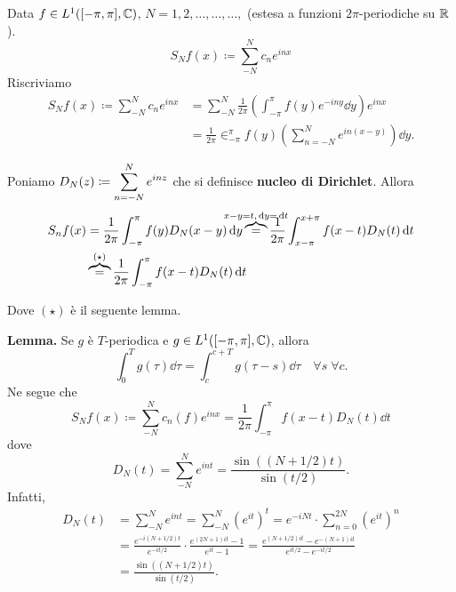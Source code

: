 Data $f \in L^1([-\pi,\pi], \mathbb C) $, $N = 1,2,\ldots,\ldots,\ldots,$ (estesa a funzioni $2\pi$-periodiche su $\mathbb R$).
%
$$
S_N f(x) \coloneqq \sum_{-N}^N c_n e^{inx}  
$$
%
Riscriviamo
%
\begin{align*}
S_N f(x) \coloneqq \sum_{-N}^N c_n e^{inx} & = \sum_{-N}^N \frac{1}{2\pi} \left( \int_{-\pi}^\pi f(y) e^{-iny} \dd y \right) e^{inx} \\
& = \frac{1}{2\pi} \in_{-\pi}^\pi f(y) \left( \sum_{n=-N}^{N} e^{in(x-y)}  \right) \dd y.
\end{align*}

Poniamo $\displaystyle D_N(z) \coloneqq \sum_{n=-N}^{N} e^{inz} $ che si definisce \textbf{nucleo di Dirichlet}. Allora
%
\begin{align*}
S_n f(x) & = \frac{1}{2\pi} \int_{-\pi}^\pi f(y) D_N(x-y) \dd y \overbrace{=}^{\mathclap{x-y=t, \dd y = \dd t}} \frac{1}{2\pi} \int_{x-\pi}^{x+\pi} f(x-t) D_N(t) \dd t \\
& \overbrace{=}^{(\star)} \frac{1}{2\pi} \int_{-\pi}^\pi f(x-t) D_N(t) \dd t 
\end{align*}

Dove $(\star)$ è il seguente lemma.

\textbf{Lemma.} Se $g$ è $T$-periodica e $g \in L^1([-\pi,\pi], \mathbb C) $, allora
%
$$
\int_0^T g(\tau) \dd \tau = \int_c^{c+T} g(\tau-s) \dd \tau \quad \forall s \; \forall c.
$$
%
Ne segue che
%
$$
S_N f(x) \coloneqq \sum_{-N}^{N} c_n(f) e^{inx} = \frac{1}{2\pi} \int_{-\pi}^\pi f(x-t) D_N(t) \dd t 
$$
%
dove
%
$$
D_N(t) = \sum_{-N}^{N} e^{int} = \frac{\sin( (N+ 1/2)t)}{\sin(t/2)}.
$$
%
Infatti,
%
\begin{align*}
D_N(t) & = \sum_{-N}^N e^{int} = \sum_{-N}^N ( e^{it} )^t = e^{-iNt} \cdot \sum_{n=0}^{2N} ( e^{it} )^n \\
& = \frac{e^{-i(N + 1/2)t}}{e^{-i t/2}} \cdot \frac{e^{(2N+1) it} - 1}{e^{it} - 1} = \frac{e^{(N+1/2)it} - e^{-(N+1)it}}{e^{i t/2} - e^{-i t/2}} \\
& = \frac{\sin ( (N+1/2)t)}{\sin(t/2)}.
\end{align*}

